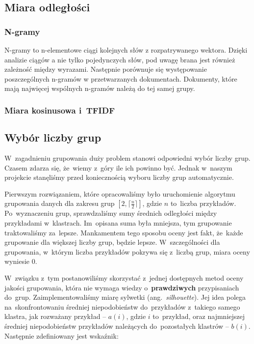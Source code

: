 \documentclass[a4paper,12pt]{mwart}
\newcommand{\ang}[1]{ang.~{\itshape #1}}
\begin{document}
\subsection{Miara odległości}

\subsubsection{N-gramy}
N-gramy to n-elementowe ciągi kolejnych słów z rozpatrywanego wektora. Dzięki
analizie ciągów a nie tylko pojedynczych słów, pod uwagę brana jest również
zależność między wyrazami. Następnie porównuje się występowanie poszczególnych
n-gramów w przetwarzanych dokumentach. Dokumenty, które mają najwięcej wspólnych
n-gramów należą do tej samej grupy.

\subsubsection{Miara kosinusowa i~TFIDF}


\subsection{Wybór liczby grup}

W~zagadnieniu grupowania duży problem stanowi odpowiedni wybór liczby grup.
Czasem zdarza się, że~wiemy z~góry ile ich powinno być. Jednak w~naszym
projekcie stanęliśmy przed koniecznością wyboru liczby grup automatycznie.

Pierwszym rozwiązaniem, które opracowaliśmy było uruchomienie algorytmu
grupowania danych dla zakresu grup $[2, \lceil \frac{n}{2} \rceil]$, gdzie $n$
to~liczba przykładów. Po~wyznaczeniu grup, sprawdzaliśmy sumy średnich
odległości między przykładami w~klastrach. Im~opisana suma była mniejsza, tym
grupowanie traktowaliśmy za~lepsze. Mankamentem tego sposobu oceny jest fakt,
że~każde grupowanie dla większej liczby grup, będzie lepsze. W~szczególności
dla grupowania, w~którym liczba przykładów pokrywa się z~liczbą grup, miara
oceny wyniesie $0$.

W~związku z~tym postanowiliśmy skorzystać z~jednej dostępnych metod oceny
jakości grupowania, która nie wymaga wiedzy o~\textbf{prawdziwych}
przypisaniach do~grup. Zaimplementowaliśmy miarę sylwetki (\ang{silhouette}).
Jej idea polega na~skonfrontowaniu średniej niepodobieństw do~przykładów
z~takiego samego klastra, jak rozważany przykład -- $a(i)$, gdzie $i$
to~przykład, oraz najmniejszej średniej niepodobieństw przykładów należących
do~pozostałych klastrów -- $b(i)$. Następnie zdefiniowany jest wskaźnik:
\end{document}
